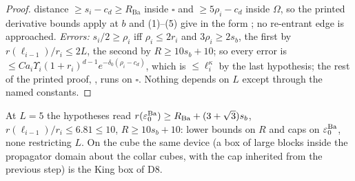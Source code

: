 \begin{proof}
distance $\ge s_i-c_d\ge R_{\mathrm{Ba}}$ inside $\square$ and $\ge5\rho_i-c_d$ inside $\Omega$, so the printed derivative bounds apply at $b$ and (1)--(5) give \cite[(2.66)]{Ba2} in the form \cite[(2.77)]{Ba2}; no re-entrant edge is approached. \emph{Errors:} $s_i/2\ge\rho_i$ iff $\rho_i\le2r_i$ and $3\rho_i\ge2s_b$, the first by $r(\ell_{i-1})/r_i\le2L$, the second by $R\ge10s_b+10$; so every error is $\le Ca_i\Upsilon_i(1+r_i)^{d-1}e^{-\delta_0(\rho_i-c_d)}$, which is $\le\ell_i^\kappa$ by the last hypothesis; the rest of the printed proof, \cite[(2.69)--(2.77)]{Ba2}, runs on $\square$. Nothing depends on $L$ except through the named constants.
\end{proof}
At $L=5$ the hypotheses read $r(\varepsilon_0^{\mathrm{Ba}})\ge R_{\mathrm{Ba}}+(3+\sqrt3)s_b$, $r(\ell_{i-1})/r_i\le6.81\le10$, $R\ge10s_b+10$: lower bounds on $R$ and caps on $\varepsilon_0^{\mathrm{Ba}}$, none restricting $L$. On the cube the same device (a box of large blocks inside the propagator domain about the collar cubes, with the cap inherited from the previous step) is the King box of D8.
